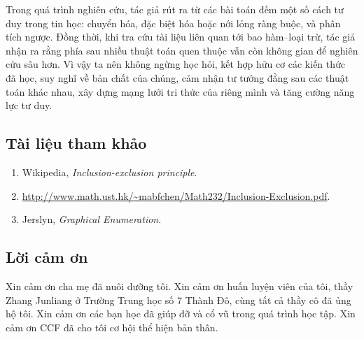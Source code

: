\documentclass[11pt]{article}
\begin{document}
Trong quá trình nghiên cứu, tác giả rút ra từ các bài toán đếm một số cách tư
duy trong tin học: chuyển hóa, đặc biệt hóa hoặc nới lỏng ràng buộc, và phân
tích ngược. Đồng thời, khi tra cứu tài liệu liên quan tới bao hàm--loại trừ,
tác giả nhận ra rằng phía sau nhiều thuật toán quen thuộc vẫn còn không gian
để nghiên cứu sâu hơn. Vì vậy ta nên không ngừng học hỏi, kết hợp hữu cơ các
kiến thức đã học, suy nghĩ về bản chất của chúng, cảm nhận tư tưởng đằng sau
các thuật toán khác nhau, xây dựng mạng lưới tri thức của riêng mình và tăng
cường năng lực tư duy.

\subsection{Tài liệu tham khảo}

\begin{enumerate}
  \item Wikipedia, \emph{Inclusion-exclusion principle}.
  \item \url{http://www.math.ust.hk/~mabfchen/Math232/Inclusion-Exclusion.pdf}.
  \item Jerslyn, \emph{Graphical Enumeration}.
\end{enumerate}

\subsection{Lời cảm ơn}

Xin cảm ơn cha mẹ đã nuôi dưỡng tôi. Xin cảm ơn huấn luyện viên của tôi, thầy
Zhang Junliang ở Trường Trung học số 7 Thành Đô, cùng tất cả thầy cô đã ủng hộ
tôi. Xin cảm ơn các bạn học đã giúp đỡ và cổ vũ trong quá trình học tập. Xin
cảm ơn CCF đã cho tôi cơ hội thể hiện bản thân.
\end{document}
